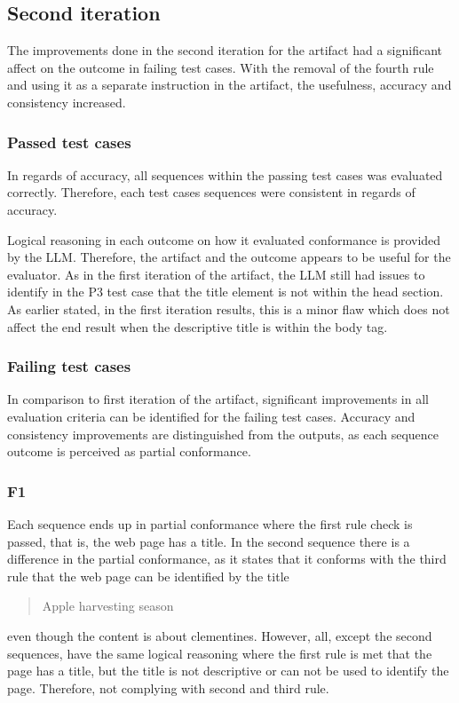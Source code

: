 \subsection{Second iteration}

The improvements done in the second iteration for the artifact had a significant affect on the outcome in failing test cases. With the removal of the fourth rule and using it as a separate instruction in the artifact, the usefulness, accuracy and consistency increased.

\subsubsection{Passed test cases}

In regards of accuracy, all sequences within the passing test cases was evaluated correctly. Therefore, each test cases sequences were consistent in regards of accuracy.

Logical reasoning in each outcome on how it evaluated conformance is provided by the LLM. Therefore, the artifact and the outcome appears to be useful for the evaluator. As in the first iteration of the artifact, the LLM still had issues to identify in the P3 test case that the title element is not within the head section. As earlier stated, in the first iteration results, this is a minor flaw which does not affect the end result when the descriptive title is within the body tag.

\subsubsection{Failing test cases}

In comparison to first iteration of the artifact, significant improvements in all evaluation criteria can be identified for the failing test cases. Accuracy and consistency improvements are distinguished from the outputs, as each sequence outcome is perceived as partial conformance. 

\subsubsection{F1}

Each sequence ends up in partial conformance where the first rule check is passed, that is, the web page has a title. In the second sequence there is a difference in the partial conformance, as it states that it conforms with the third rule that the web page can be identified by the title \blockquote{Apple harvesting season} even though the content is about clementines. However, all, except the second sequences, have the same logical reasoning where the first rule is met that the page has a title, but the title is not descriptive or can not be used to identify the page. Therefore, not complying with second and third rule.


